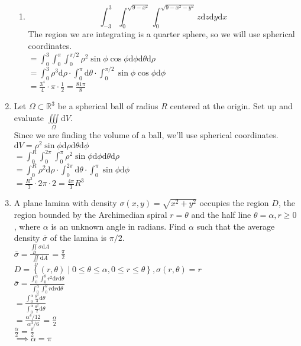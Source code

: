 \begin{enumerate}
\begin{enumerate}[label=\alph*.]
		\item \begin{equation*}
			\int_{-3}^{3}{\int_{0}^{\sqrt{9 - x^2}}{\int_{0}^{\sqrt{9 - x^2 - y^2}}{z\mathrm{d}z}\mathrm{d}y}\mathrm{d}x}
		\end{equation*}
		\indent
		The region we are integrating is a quarter sphere, so we will use spherical coordinates.\\
		$= \int_{0}^{3}{\int_{0}^{\pi}{\int_{0}^{\pi/2}{\rho^2\sin{\phi}\cos{\phi}\mathrm{d}\phi}\mathrm{d}\theta}\mathrm{d}\rho}$\\
		$= \int_{0}^{3}{\rho^3\mathrm{d}\rho}\cdot\int_{0}^{\pi}{\mathrm{d}\theta} \cdot \int_{0}^{\pi/2}{\sin{\phi}\cos{\phi}\mathrm{d}\phi}$\\
		$= \frac{3^4}{4} \cdot \pi \cdot \frac{1}{2} = \frac{81\pi}{8}$\\
	\end{enumerate}
	
	\item Let $\Omega \subset \mathbb{R}^3$ be a spherical ball of radius $R$ centered at the origin. Set up and evaluate $\iiint\limits_{\Omega}{\mathrm{d}V}$.\\
	\indent
	Since we are finding the volume of a ball, we'll use spherical coordinates.\\
	$\mathrm{d}V = \rho^2\sin{\phi}\mathrm{d}\rho\mathrm{d}\theta\mathrm{d}\phi$\\
	$= \int_{0}^{R}{\int_{0}^{2\pi}{\int_{0}^{\pi}{\rho^2\sin{\phi}\mathrm{d}\phi}\mathrm{d}\theta}\mathrm{d}\rho}$\\
	$= \int_{0}^{R}{\rho^2\mathrm{d}\rho} \cdot \int_{0}^{2\pi}{\mathrm{d}\theta} \cdot \int_{0}^{\pi}{\sin{\phi}\mathrm{d}\phi}$\\
	$= \frac{R^3}{3} \cdot 2\pi \cdot 2 = \frac{4\pi}{3}R^3$\\
	
	\item A plane lamina with density $\sigma(x,y) = \sqrt{x^2+y^2}$ occupies the region $D$, the region bounded by the Archimedian spiral $r = \theta$ and the half line $\theta = \alpha, r \geq 0$, where $\alpha$ is an unknown angle in radians. Find $\alpha$ such that the average density $\bar{\sigma}$ of the lamina is $\pi / 2$.\\
	\indent
	$\bar{\sigma} = \frac{\iint\limits_{D}{\sigma\mathrm{d}A}}{\iint\limits_{D}{\mathrm{d}A}} = \frac{\pi}{2}$\\
	$D = \left\{(r,\theta) \mid 0 \leq \theta \leq \alpha, 0 \leq r \leq \theta \right\}, \sigma(r,\theta) = r$\\
	$\bar{\sigma} = \frac{\int_{0}^{\alpha}{\int_{0}^{\theta}{r^2\mathrm{d}r}\mathrm{d}\theta}}{\int_{0}^{\alpha}{\int_{0}^{\theta}{r\mathrm{d}r}\mathrm{d}\theta}}$\\
	$= \frac{\int_{0}^{\alpha}{\frac{\theta^3}{3}\mathrm{d}\theta}}{\int_{0}^{\alpha}{\frac{\theta^2}{2}\mathrm{d}\theta}}$\\
	$= \frac{\alpha^4/12}{\alpha^3/6} = \frac{\alpha}{2}$\\
	$\frac{\alpha}{2} = \frac{\pi}{2}$\\
	$\implies \alpha = \pi$\\
	

\end{enumerate}
